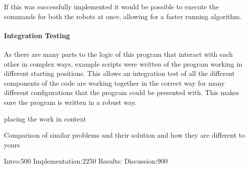 If this was successfully implemented it would be possible to execute the commands for both the robots at once, allowing for a faster running algorithm.


\paragraph{Integration Testing}

As there are many parts to the logic of this program that interact with each other in complex ways, example scripts were written of the program working in different starting positions. This allows an integration test of all the different components of the code are working together in the correct way for many different configurations that the program could be presented with. This makes sure the program is written in a robust way.





placing the work in context 

Comparison of similar problems and their solution and how they are different to yours



Intro:500
Implementation:2250
Results:
Discussion:900